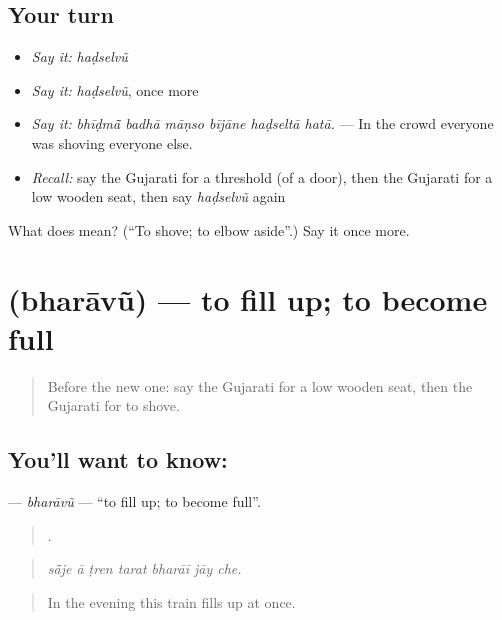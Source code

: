 \subsection*{Your turn}
\begin{itemize}
\raggedright
  \item \emph{Say it:} \emph{haḍselvũ}
  \item \emph{Say it:} \emph{haḍselvũ}, once more
  \item \emph{Say it:} \emph{bhīḍmā̃ badhā māṇso bījāne haḍseltā hatā.} — In the crowd everyone was shoving everyone else.
  \item \emph{Recall:} say the Gujarati for a threshold (of a door), then the Gujarati for a low wooden seat, then say \emph{haḍselvũ} again
\end{itemize}

\begin{tcolorbox}[breakable,colback=teal!4,colframe=teal!35!black,title={Before you move on}]
What does  mean? (\textquotedblleft{}To shove; to elbow aside\textquotedblright{}.) Say it once more.
\end{tcolorbox}
\section[\texorpdfstring{\gu{ભરાવું} (bharāvũ)}{ભરાવું (bharāvũ)}]{ (bharāvũ) — to fill up; to become full}

\label{lesson:GU-C397-bharavu}



\begin{quote}
Before the new one: say the Gujarati for a low wooden seat, then the Gujarati for to shove.
\end{quote}

\subsection*{You'll want to know: }
\textbf{} — \emph{bharāvũ} — \textquotedblleft{}to fill up; to become full\textquotedblright{}.

\begin{quote}
      .
\end{quote}

\begin{quote}
\emph{sā̃je ā ṭren tarat bharāī jāy che.}
\end{quote}

\begin{quote}
In the evening this train fills up at once.
\end{quote}

